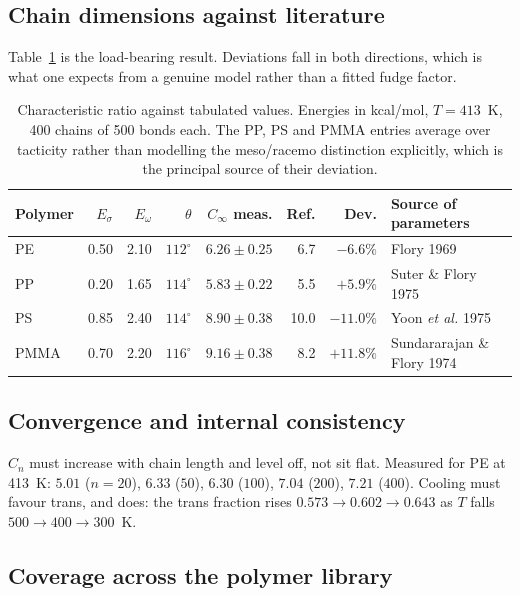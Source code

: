 \documentclass[11pt,a4paper]{article}
\begin{document}
\subsection{Chain dimensions against literature}

Table~\ref{tab:cinf} is the load-bearing result. Deviations fall in both
directions, which is what one expects from a genuine model rather than a
fitted fudge factor.

\begin{table}[t]
\centering
\small
\begin{tabular}{lrrrrrrl}
\toprule
Polymer & $E_\sigma$ & $E_\omega$ & $\theta$ & $C_\infty$ meas. & Ref. & Dev. & Source of parameters \\
\midrule
PE   & 0.50 & 2.10 & $112^\circ$ & $6.26 \pm 0.25$ & 6.7  & $-6.6\%$  & Flory 1969~\cite{flory1969} \\
PP   & 0.20 & 1.65 & $114^\circ$ & $5.83 \pm 0.22$ & 5.5  & $+5.9\%$  & Suter \& Flory 1975~\cite{suter1975} \\
PS   & 0.85 & 2.40 & $114^\circ$ & $8.90 \pm 0.38$ & 10.0 & $-11.0\%$ & Yoon \emph{et al.} 1975~\cite{yoon1975} \\
PMMA & 0.70 & 2.20 & $116^\circ$ & $9.16 \pm 0.38$ & 8.2  & $+11.8\%$ & Sundararajan \& Flory 1974~\cite{sundararajan1974} \\
\bottomrule
\end{tabular}
\caption{Characteristic ratio against tabulated values. Energies in kcal/mol,
$T = 413$~K, 400 chains of 500 bonds each. The PP, PS and PMMA entries average
over tacticity rather than modelling the meso/racemo distinction explicitly,
which is the principal source of their deviation.}
\label{tab:cinf}
\end{table}

\subsection{Convergence and internal consistency}

$C_n$ must increase with chain length and level off, not sit flat.
Measured for PE at 413~K: $5.01$ ($n=20$), $6.33$ ($50$), $6.30$ ($100$),
$7.04$ ($200$), $7.21$ ($400$). Cooling must favour trans, and does:
the trans fraction rises $0.573 \rightarrow 0.602 \rightarrow 0.643$ as
$T$ falls $500 \rightarrow 400 \rightarrow 300$~K.

\subsection{Coverage across the polymer library}
\end{document}
